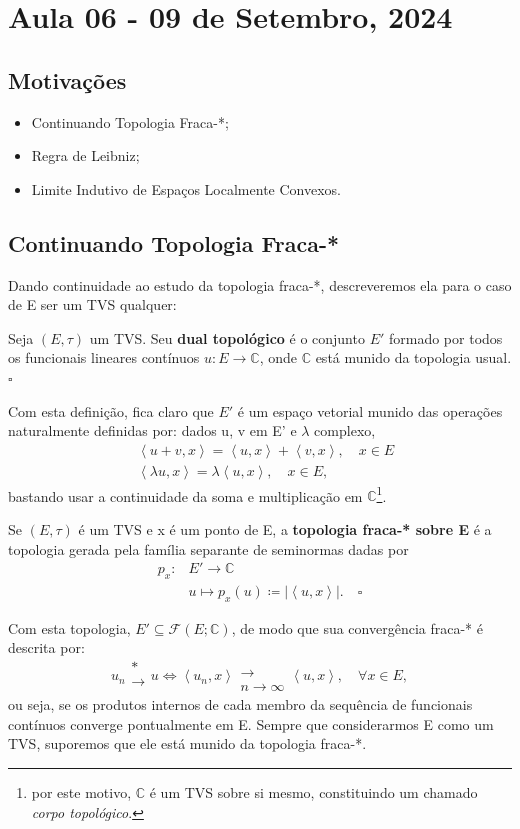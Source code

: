 \documentclass[../distribution_theory_notes.tex]{subfiles}
\begin{document}
\section{Aula 06 - 09 de Setembro, 2024}
\subsection{Motivações}
\begin{itemize}
 \item Continuando Topologia Fraca-*; 
 \item Regra de Leibniz;
 \item Limite Indutivo de Espaços Localmente Convexos. 
\end{itemize}
\subsection{Continuando Topologia Fraca-*}
Dando continuidade ao estudo da topologia fraca-*, descreveremos ela para o caso de E ser um TVS qualquer:

\begin{def*}
  Seja \((E, \tau )\) um TVS. Seu \textbf{dual topológico} é o conjunto \(E'\) formado por todos os funcionais lineares contínuos \(u:E\rightarrow \mathbb{C}\), onde \(\mathbb{C}\) está munido da topologia usual. \(\square\)
\end{def*}

Com esta definição, fica claro que \(E'\) é um espaço vetorial munido das operações naturalmente definidas por: dados u, v em E' e \(\lambda \) complexo, 
\begin{align*}
  & \left< u+v, x \right> = \left< u, x \right> + \left< v, x \right>,\quad x\in E\\ 
  & \left< \lambda u, x \right> = \lambda \left< u, x \right>,\quad x\in E,
\end{align*}
bastando usar a continuidade da soma e multiplicação em \(\mathbb{C}\)\footnote{por este motivo, \(\mathbb{C}\) é um TVS sobre si mesmo, constituindo um chamado \textit{corpo topológico}.}.

\begin{def*}
  Se \((E, \tau )\) é um TVS e x é um ponto de E, a \textbf{topologia fraca-* sobre E} é a topologia gerada pela família separante de seminormas dadas por 
 \begin{align*}
   p_x:&E'\rightarrow \mathbb{C}\\ 
       &u\mapsto p_x(u)\coloneqq |\left< u, x \right>|.\quad \square
 \end{align*} 
\end{def*}
  Com esta topologia, \(E'\subseteq \mathcal{F}(E; \mathbb{C})\), de modo que sua convergência fraca-* é descrita por: 
    \[
      u_{n}\substack{* \\ \longrightarrow \\ }u \Longleftrightarrow  \left< u_{n}, x \right>\substack{ \\ \longrightarrow \\ n\to \infty}\left< u, x \right>,\quad \forall x\in E,
    \]
    ou seja, se os produtos internos de cada membro da sequência de funcionais contínuos converge pontualmente em E. Sempre que considerarmos E como um TVS, suporemos que ele está munido da topologia fraca-*.
\end{document}
